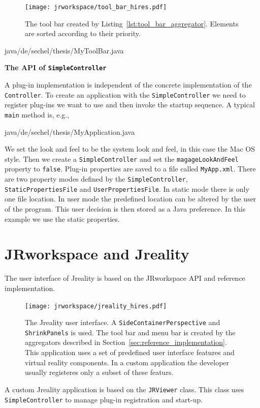 \documentclass[Thesis.tex]{subfiles}
\begin{document}
\begin{figure}[H]
\centering
\texttt{[image: jrworkspace/tool\_bar\_hires.pdf]}
\caption{The tool bar created by Listing~\ref{lst:tool_bar_aggregator}. Elements are sorted according to their
priority.}
\label{fig:tool_bar_aggregator}
\end{figure}

 {java/de/sechel/thesis/MyToolBar.java}

{\bf The API of {\tt SimpleController}}

A plug-in implementation is independent of the concrete implementation of the {\tt Controller}. To create an
application with the {\tt SimpleController} we need to register plug-ins we want to use and then invoke the
startup sequence. A typical {\tt main} method is, e.g.,

 {java/de/sechel/thesis/MyApplication.java}

We set the look and feel to be the system look and feel, in this case the Mac OS style. Then we create a
{\tt SimpleController} and set the {\tt magageLookAndFeel} property to {\tt false}. Plug-in properties are saved
to a file called {\tt MyApp.xml}. There are two property modes defined by the {\tt SimpleController}, {\tt StaticPropertiesFile}
and {\tt UserPropertiesFile}. In static mode there is only one file location. In user mode the predefined location can
be altered by the user of the program. This user decision is then stored as a {\sc Java} preference. In this example 
we use the static properties.

\section{{\sc JRworkspace} and {\sc Jreality}}

The user interface of {\sc Jreality} \cite{JrealityWebsite} is based on the {\sc JRworkspace} API and reference
implementation.

\begin{figure}
\centering
\texttt{[image: jrworkspace/jreality\_hires.pdf]}
\caption[The {\sc Jreality} user interface.]{The {\sc Jreality} user interface. A {\tt SideContainerPerspective} 
and {\tt ShrinkPanels} is used. The tool bar and 
menu bar is created by the aggregators described in Section~\ref{sec:reference_implementation}. This application
uses a set of predefined user interface features and virtual reality components. In a custom application the developer 
usually registeres only a subset of these featurs.}
\label{fig:jrworkspace_jreality}
\end{figure}

A custom {\sc Jreality} application is based on the {\tt JRViewer} class. This class uses {\tt SimpleController} to manage
plug-in registration and start-up. 

\subfilebibliography
\end{document}
